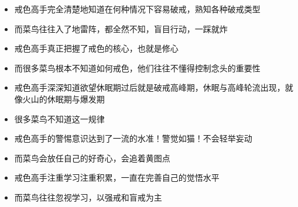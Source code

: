 \documentclass{ctexart}
\begin{document}
\begin{paracol}{2}
    \begin{itemize}
        \item 戒色高手完全清楚地知道在何种情况下容易破戒，熟知各种破戒类型
    \end{itemize}
    \switchcolumn
    \begin{itemize}
        \item 而菜鸟往往入了地雷阵，都全然不知，盲目行动，一踩就炸
    \end{itemize}
    \switchcolumn*

    \begin{itemize}
        \item 戒色高手真正把握了戒色的核心，也就是修心
    \end{itemize}
    \switchcolumn
    \begin{itemize}
        \item 而很多菜鸟根本不知道如何戒色，他们往往不懂得控制念头的重要性
    \end{itemize}
    \switchcolumn*

    \begin{itemize}
        \item 戒色高手深深知道欲望休眠期过后就是破戒高峰期，休眠与高峰轮流出现，就像火山的休眠期与爆发期
    \end{itemize}
    \switchcolumn
    \begin{itemize}
        \item 很多菜鸟不知道这一规律
    \end{itemize}
    \switchcolumn*

    \begin{itemize}
        \item 戒色高手的警惕意识达到了一流的水准！警觉如猫！不会轻举妄动
    \end{itemize}
    \switchcolumn
    \begin{itemize}
        \item 而菜鸟会放任自己的好奇心，会追着黄图点
    \end{itemize}
    \switchcolumn*

    \begin{itemize}
        \item 戒色高手注重学习注重积累，一直在完善自己的觉悟水平
    \end{itemize}
    \switchcolumn
    \begin{itemize}
        \item 而菜鸟往往忽视学习，以强戒和盲戒为主
    \end{itemize}
    \switchcolumn*


\end{paracol}
\end{document}
